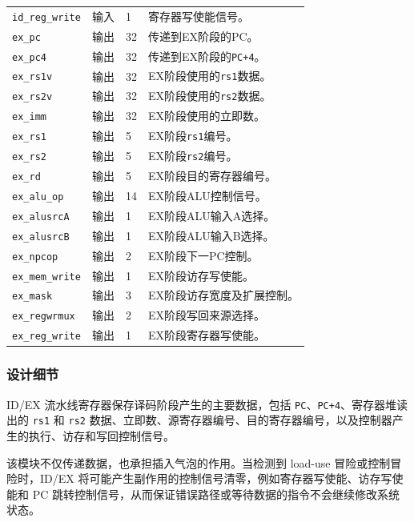 \documentclass[12pt,a4paper]{ctexart}
\newcommand{\code}[1]{\texttt{#1}}
\begin{document}
{\begin{longtable}{p{3.2cm}p{1.5cm}p{2.1cm}p{7.0cm}}
	\code{id\_reg\_write} & 输入 & 1  & 寄存器写使能信号。            \\
	\code{ex\_pc}         & 输出 & 32 & 传递到EX阶段的PC。          \\
	\code{ex\_pc4}        & 输出 & 32 & 传递到EX阶段的\code{PC+4}。 \\
	\code{ex\_rs1v}       & 输出 & 32 & EX阶段使用的\code{rs1}数据。 \\
	\code{ex\_rs2v}       & 输出 & 32 & EX阶段使用的\code{rs2}数据。 \\
	\code{ex\_imm}        & 输出 & 32 & EX阶段使用的立即数。          \\
	\code{ex\_rs1}        & 输出 & 5  & EX阶段\code{rs1}编号。    \\
	\code{ex\_rs2}        & 输出 & 5  & EX阶段\code{rs2}编号。    \\
	\code{ex\_rd}         & 输出 & 5  & EX阶段目的寄存器编号。         \\
	\code{ex\_alu\_op}    & 输出 & 14 & EX阶段ALU控制信号。         \\
	\code{ex\_alusrcA}    & 输出 & 1  & EX阶段ALU输入A选择。        \\
	\code{ex\_alusrcB}    & 输出 & 1  & EX阶段ALU输入B选择。        \\
	\code{ex\_npcop}      & 输出 & 2  & EX阶段下一PC控制。          \\
	\code{ex\_mem\_write} & 输出 & 1  & EX阶段访存写使能。           \\
	\code{ex\_mask}       & 输出 & 3  & EX阶段访存宽度及扩展控制。       \\
	\code{ex\_regwrmux}   & 输出 & 2  & EX阶段写回来源选择。          \\
	\code{ex\_reg\_write} & 输出 & 1  & EX阶段寄存器写使能。          \\
	\bottomrule
\end{longtable}
}

\subsubsection*{设计细节}

ID/EX 流水线寄存器保存译码阶段产生的主要数据，包括 \code{PC}、\code{PC+4}、寄存器堆读出的 \code{rs1} 和 \code{rs2} 数据、立即数、源寄存器编号、目的寄存器编号，以及控制器产生的执行、访存和写回控制信号。

该模块不仅传递数据，也承担插入气泡的作用。当检测到 load-use 冒险或控制冒险时，ID/EX 将可能产生副作用的控制信号清零，例如寄存器写使能、访存写使能和 PC 跳转控制信号，从而保证错误路径或等待数据的指令不会继续修改系统状态。
\end{document}
